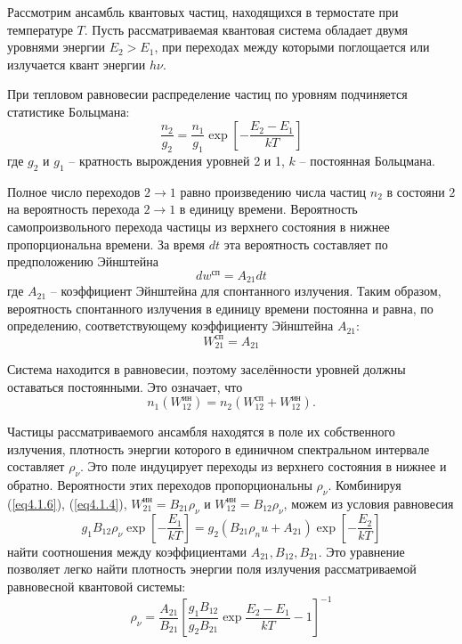 
Рассмотрим ансамбль квантовых частиц, находящихся в термостате при
температуре \( T \). Пусть рассматриваемая квантовая система обладает двумя
уровнями энергии \( E_2 > E_1 \), при переходах между которыми поглощается
или излучается квант энергии \( h\nu \).

При тепловом равновесии распределение частиц по уровням подчиняется статистике
Больцмана:
\begin{equation}
    \frac{n_2}{g_2} = \frac{n_1}{g_1}\exp
        \left[ -\frac{E_2 - E_1}{kT}\right]
    \label{eq4.1.4}
\end{equation}
где \( g_2 \) и \( g_1 \) -- кратность вырождения уровней 2 и 1,
\( k \) -- постоянная Больцмана.

Полное число переходов \( 2 \rightarrow 1 \) равно произведению числа частиц
\( n_2 \) в состояни \( 2 \) на вероятность перехода \( 2 \rightarrow 1 \)
в единицу времени. Вероятность самопроизвольного перехода частицы из верхнего
состояния в нижнее пропорциональна времени. За время \( dt \) эта вероятность
составляет по предположению Эйнштейна
\[
    dw^\text{сп} = A_{21} dt
\]
где \( A_{21} \) -- коэффициент Эйнштейна для спонтанного излучения. Таким
образом, вероятность спонтанного излучения в единицу времени постоянна и равна,
по определению, соответствующему коэффициенту Эйнштейна
\( A_{21} \):
\begin{equation}
    W_{21}^\text{сп} = A_{21}
    \label{eq4.1.6}
\end{equation}

Система находится в равновесии, поэтому заселённости уровней должны оставаться
постоянными. Это означает, что
\[
    n_1(W_{12}^\text{ин}) = n_2(W_{12}^\text{сп} + W_{12}^\text{ин}).
\]

Частицы рассматриваемого ансамбля находятся в поле их собственного излучения,
плотность энергии которого в единичном спектральном интервале составляет
\( \rho_\nu \). Это поле индуцирует переходы из верхнего состояния в нижнее
и обратно. Вероятности этих переходов пропорциональны \( \rho_\nu \).
Комбинируя (\ref{eq4.1.6}), (\ref{eq4.1.4}),
\( W_{21}^\text{ин} = B_{21}\rho_\nu \) и
\( W_{12}^\text{ин} = B_{12}\rho_\nu \), можем из условия равновесия
\[
    g_1 B_{12} \rho_\nu \exp\left[ -\frac{E_1}{kT} \right] =
    g_2 \left( B_{21}\rho_nu + A_{21} \right)
        \exp\left[ -\frac{E_2}{kT} \right]
\]
найти соотношения между коэффициентами \( A_{21}, B_{12}, B_{21} \). Это
уравнение позволяет легко найти плотность энергии поля излучения
рассматриваемой равновесной квантовой системы:
\[
    \rho_\nu = \frac{A_{21}}{B_{21}}
        \left[
            \frac{g_1 B_{12}}{g_2 B_{21}}\exp\frac{E_2 - E_1}{kT} - 1
        \right]^{-1}
\]

